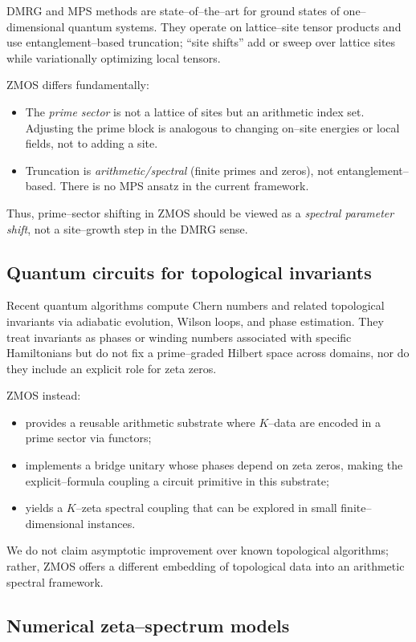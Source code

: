 \documentclass[11pt]{article}
\begin{document}
DMRG and MPS methods are state--of--the--art for ground states of one--dimensional quantum systems. They operate on lattice--site tensor products and use entanglement--based truncation; ``site shifts'' add or sweep over lattice sites while variationally optimizing local tensors.

ZMOS differs fundamentally:
\begin{itemize}
  \item The \emph{prime sector} is not a lattice of sites but an arithmetic index set. Adjusting the prime block is analogous to changing on--site energies or local fields, not to adding a site.
  \item Truncation is \emph{arithmetic/spectral} (finite primes and zeros), not entanglement--based. There is no MPS ansatz in the current framework.
\end{itemize}
Thus, prime--sector shifting in ZMOS should be viewed as a \emph{spectral parameter shift}, not a site--growth step in the DMRG sense.

\subsection{Quantum circuits for topological invariants}

Recent quantum algorithms compute Chern numbers and related topological invariants via adiabatic evolution, Wilson loops, and phase estimation.
They treat invariants as phases or winding numbers associated with specific Hamiltonians but do not fix a prime--graded Hilbert space across domains, nor do they include an explicit role for zeta zeros.

ZMOS instead:
\begin{itemize}
  \item provides a reusable arithmetic substrate where $K$--data are encoded in a prime sector via functors;
  \item implements a bridge unitary whose phases depend on zeta zeros, making the explicit--formula coupling a circuit primitive in this substrate;
  \item yields a $K$--zeta spectral coupling that can be explored in small finite--dimensional instances.
\end{itemize}
We do not claim asymptotic improvement over known topological algorithms; rather, ZMOS offers a different embedding of topological data into an arithmetic spectral framework.

\subsection{Numerical zeta--spectrum models}
\end{document}
